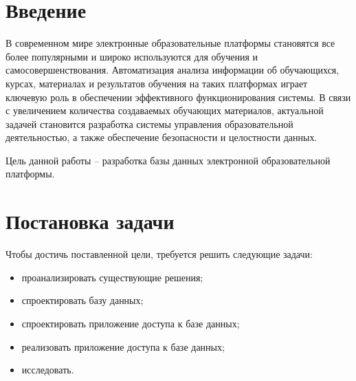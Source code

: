 \chapter*{Введение}

В современном мире электронные образовательные платформы становятся все более популярными и широко используются для обучения и самосовершенствования. Автоматизация анализа информации об обучающихся, курсах, материалах и результатов обучения на таких платформах играет ключевую роль в обеспечении эффективного функционирования системы. В связи с увеличением количества создаваемых обучающих материалов, актуальной задачей становится разработка системы управления образовательной деятельностью, а также обеспечение безопасности и целостности данных.

Цель данной работы -- разработка базы данных электронной образовательной платформы.

\chapter*{Постановка задачи}

Чтобы достичь поставленной цели, требуется решить следующие задачи: 
\begin{itemize}
    \item проанализировать существующие решения;
    \item спроектировать базу данных;
    \item спроектировать приложение доступа к базе данных;
    \item реализовать приложение доступа к базе данных;
    \item исследовать.
\end{itemize}
